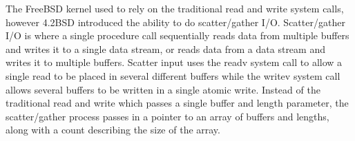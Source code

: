 \documentclass[10pt,draftclsnofoot,onecolumn,journal,compsoc]{IEEEtran}
\begin{document}
        The FreeBSD kernel used to rely on the traditional read and write system calls, however 4.2BSD introduced the ability to do scatter/gather I/O. \cite{freebsd.org}
        Scatter/gather I/O is where a single procedure call sequentially reads data from multiple buffers and writes it to a single data stream, or reads data from a data stream and writes it to multiple buffers.
        Scatter input uses the readv system call to allow a single read to be placed in several different buffers while the writev system call allows several buffers to be written in a single atomic write.
        Instead of the traditional read and write which passes a single buffer and length parameter, the scatter/gather process passes in a pointer to an array of buffers and lengths, along with a count describing the size of the array.
\newpage


\end{document}
